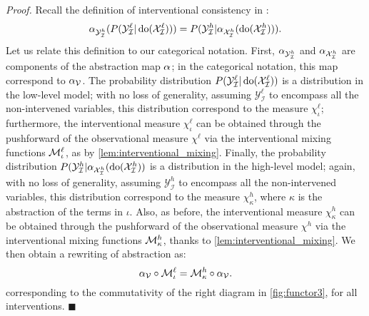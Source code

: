 \emph{Proof.} 
Recall the definition of interventional consistency in :
\begin{equation}%
        \alphamap{\mathcal{Y}^h_\mathcal{I}}(P(\mathcal{Y}^\ell_\mathcal{I} \vert \doint(\mathcal{X}^\ell_\mathcal{I}))) =  P(\mathcal{Y}^h_\mathcal{I} \vert \alphamap{\mathcal{X}^h_\mathcal{I}}(\doint(\mathcal{X}^h_\mathcal{I}))).
\end{equation}
Let us relate this definition to our categorical notation. First, $\alpha_{\mathcal{Y}^h_\mathcal{I}}$ and $\alpha_{\mathcal{X}^h_\mathcal{I}}$ are components of the abstraction map $\alpha_{}$; in the categorical notation, this map correspond to $\alpha_{\mathcal{V}}$. 
The probability distribution $P(\mathcal{Y}^\ell_\mathcal{I} \vert \operatorname{do}(\mathcal{X}^\ell_\mathcal{I}))$ is a distribution in the low-level model; with no loss of generality, assuming $\mathcal{Y}^\ell_\mathcal{I}$ to encompass all the non-intervened variables, this distribution correspond to the measure $\chi_\iota^\ell$; furthermore, the interventional measure $\chi_\iota^\ell$ can be obtained through the pushforward of the observational measure $\chi^\ell$ via the interventional mixing functions $\mathcal{M}_\iota^\ell$, as by \cref{lem:interventional_mixing}.
Finally, the probability distribution $P(\mathcal{Y}^h_\mathcal{I} \vert \alpha_{\mathcal{X}^h_\mathcal{I}}(\operatorname{do}(\mathcal{X}^h_\mathcal{I}))$ is a distribution in the high-level model; again, with no loss of generality, assuming $\mathcal{Y}^h_\mathcal{I}$ to encompass all the non-intervened variables, this distribution correspond to the measure $\chi_\kappa^h$, where $\kappa$ is the abstraction of the terms in $\iota$. Also, as before, the interventional measure $\chi_\kappa^h$ can be obtained through the pushforward of the observational measure $\chi^h$ via the interventional mixing functions $\mathcal{M}_\kappa^h$, thanks to \cref{lem:interventional_mixing}.
We then obtain a rewriting of abstraction as:
\begin{equation}%
        \alphamap{\myendogenousvals} \circ \mymixing_\iota^\ell =  \mymixing_\kappa^h \circ \alphamap{\myendogenousvals}.
\end{equation}
corresponding to the commutativity of the right diagram in \cref{fig:functor3}, for all interventions. $\blacksquare$

